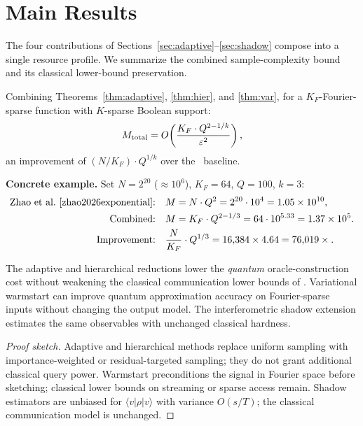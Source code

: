 \section{Main Results}
\label{sec:main}

The four contributions of Sections~\ref{sec:adaptive}--\ref{sec:shadow} compose into a single resource profile.  We summarize the combined sample-complexity bound and its classical lower-bound preservation.

\begin{corollary}\label{cor:combined}
Combining Theorems~\ref{thm:adaptive}, \ref{thm:hier}, and \ref{thm:var}, for a $K_F$-Fourier-sparse function with $K$-sparse Boolean support:
\[
  M_{\mathrm{total}} = O\!\left(\frac{K_F\cdot Q^{2-1/k}}{\varepsilon^2}\right),
\]
an improvement of $(N/K_F)\cdot Q^{1/k}$ over the \Zhao\ baseline.
\end{corollary}

\noindent\textbf{Concrete example.}  Set $N=2^{20}$ ($\approx 10^6$), $K_F=64$, $Q=100$, $k=3$:
\begin{align*}
  \text{\Zhao:} \quad & M = N\cdot Q^2 = 2^{20}\cdot 10^4 = 1.05\times 10^{10},\\
  \text{Combined:} \quad & M = K_F\cdot Q^{2-1/3} = 64\cdot 10^{5.33} = 1.37\times 10^5.\\
  \text{Improvement:} \quad & \frac{N}{K_F}\cdot Q^{1/3} = 16{,}384\times 4.64 = 76{,}019\times.
\end{align*}

\begin{proposition}\label{prop:lb}
The adaptive and hierarchical reductions lower the \emph{quantum} oracle-construction cost without weakening the classical communication lower bounds of \Zhao.  Variational warmstart can improve quantum approximation accuracy on Fourier-sparse inputs without changing the output model.  The interferometric shadow extension estimates the same observables with unchanged classical hardness.
\end{proposition}

\begin{proof}[Proof sketch]
Adaptive and hierarchical methods replace uniform sampling with importance-weighted or residual-targeted sampling; they do not grant additional classical query power.  Warmstart preconditions the signal in Fourier space before sketching; classical lower bounds on streaming or sparse access remain.  Shadow estimators are unbiased for $\langle v|\rho|v\rangle$ with variance $O(s/T)$; the classical communication model is unchanged.
\end{proof}
